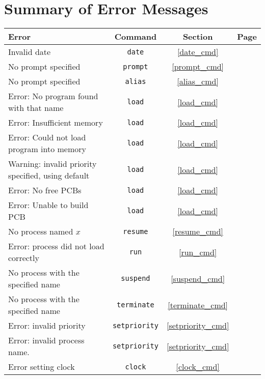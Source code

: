 \chapter{Summary of Error Messages}
\label{summary_of_errors}

\begin{tabular}{| l | c | c | c |}
    \hline
    \bf Error & \bf Command & \bf Section & \bf Page \\
    \hline
    Invalid date & {\tt date} & \ref{date_cmd} & \pageref{date_cmd} \\
    \hline
    No prompt specified & {\tt prompt} & \ref{prompt_cmd} & \pageref{prompt_cmd} \\
    \hline
    No prompt specified & {\tt alias} & \ref{alias_cmd} & \pageref{alias_cmd} \\
    \hline
    Error: No program found with that name & {\tt load} & \ref{load_cmd} & \pageref{load_cmd} \\
    \hline
    Error: Insufficient memory & {\tt load} & \ref{load_cmd} & \pageref{load_cmd} \\
    \hline
    Error: Could not load program into memory & {\tt load} & \ref{load_cmd} & \pageref{load_cmd} \\
    \hline
    Warning: invalid priority specified, using default & {\tt load} & \ref{load_cmd} & \pageref{load_cmd} \\
    \hline
    Error: No free PCBs & {\tt load} & \ref{load_cmd} & \pageref{load_cmd} \\
    \hline
    Error: Unable to build PCB & {\tt load} & \ref{load_cmd} & \pageref{load_cmd} \\
    \hline
    No process named $x$ & {\tt resume} & \ref{resume_cmd} & \pageref{resume_cmd} \\
    \hline
    Error: process did not load correctly & {\tt run} & \ref{run_cmd} & \pageref{run_cmd} \\
    \hline
    No process with the specified name & {\tt suspend} & \ref{suspend_cmd} & \pageref{suspend_cmd} \\
    \hline
    No process with the specified name & {\tt terminate} & \ref{terminate_cmd} & \pageref{terminate_cmd} \\
    \hline
    Error: invalid priority & {\tt setpriority} & \ref{setpriority_cmd} & \pageref{setpriority_cmd} \\
    \hline
    Error: invalid process name. & {\tt setpriority} & \ref{setpriority_cmd} & \pageref{setpriority_cmd} \\
    \hline
    Error setting clock & {\tt clock} & \ref{clock_cmd} & \pageref{clock_cmd} \\
    \hline
\end{tabular}